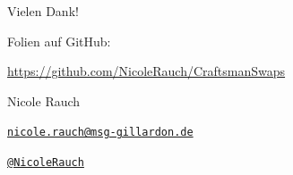 {
\begin{frame}{Vielen Dank!}

        Folien auf GitHub:
        \vspace{-0.8em}
        \begin{center}
                \url{https://github.com/NicoleRauch/CraftsmanSwaps}
        \end{center}

        \begin{block}{Nicole Rauch}
        \begin{description}[Twitterxx]
                \item[E-Mail]  \href{mailto:nicole.rauch@msg-gillardon.de}{\texttt{nicole.rauch@msg-gillardon.de}}
                \item[Twitter] \href{http://twitter.com/NicoleRauch}{\texttt{@NicoleRauch}}
        \end{description}
        \end{block}
\end{frame}
}

%
%
